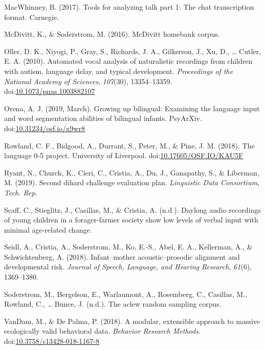\documentclass[english,table,man,floatsintext]{apa6}
\begin{document}
\leavevmode\hypertarget{ref-macwhinney2017tools}{}%
MacWhinney, B. (2017). Tools for analyzing talk part 1: The chat transcription format. Carnegie.

\leavevmode\hypertarget{ref-mcdivitt2016mcdivitt}{}%
McDivitt, K., \& Soderstrom, M. (2016). McDivitt homebank corpus.

\leavevmode\hypertarget{ref-Oller}{}%
Oller, D. K., Niyogi, P., Gray, S., Richards, J. A., Gilkerson, J., Xu, D., \ldots{} Cutler, E. A. (2010). Automated vocal analysis of naturalistic recordings from children with autism, language delay, and typical development. \emph{Proceedings of the National Academy of Sciences}, \emph{107}(30), 13354--13359. doi:\href{https://doi.org/10.1073/pnas.1003882107}{10.1073/pnas.1003882107}

\leavevmode\hypertarget{ref-orena_2019}{}%
Orena, A. J. (2019, March). Growing up bilingual: Examining the language input and word segmentation abilities of bilingual infants. PsyArXiv. doi:\href{https://doi.org/10.31234/osf.io/x9wr8}{10.31234/osf.io/x9wr8}

\leavevmode\hypertarget{ref-rowland2018}{}%
Rowland, C. F., Bidgood, A., Durrant, S., Peter, M., \& Pine, J. M. (2018). The language 0-5 project. University of Liverpool. doi:\href{https://doi.org/10.17605/OSF.IO/KAU5F}{10.17605/OSF.IO/KAU5F}

\leavevmode\hypertarget{ref-ryant2019second}{}%
Ryant, N., Church, K., Cieri, C., Cristia, A., Du, J., Ganapathy, S., \& Liberman, M. (2019). Second dihard challenge evaluation plan. \emph{Linguistic Data Consortium, Tech. Rep}.

\leavevmode\hypertarget{ref-scaff}{}%
Scaff, C., Stieglitz, J., Casillas, M., \& Cristia, A. (n.d.). Daylong audio recordings of young children in a forager-farmer society show low levels of verbal input with minimal age-related change.

\leavevmode\hypertarget{ref-Seidl2018}{}%
Seidl, A., Cristia, A., Soderstrom, M., Ko, E.-S., Abel, E. A., Kellerman, A., \& Schwichtenberg, A. (2018). Infant--mother acoustic--prosodic alignment and developmental risk. \emph{Journal of Speech, Language, and Hearing Research}, \emph{61}(6), 1369--1380.

\leavevmode\hypertarget{ref-soderstrom}{}%
Soderstrom, M., Bergelson, E., Warlaumont, A., Rosemberg, C., Casillas, M., Rowland, C., \ldots{} Bunce, J. (n.d.). The aclew random sampling corpus.

\leavevmode\hypertarget{ref-VanDam2018}{}%
VanDam, M., \& De Palma, P. (2018). A modular, extensible approach to massive ecologically valid behavioral data. \emph{Behavior Research Methods}. doi:\href{https://doi.org/10.3758/s13428-018-1167-8}{10.3758/s13428-018-1167-8}
\end{document}
